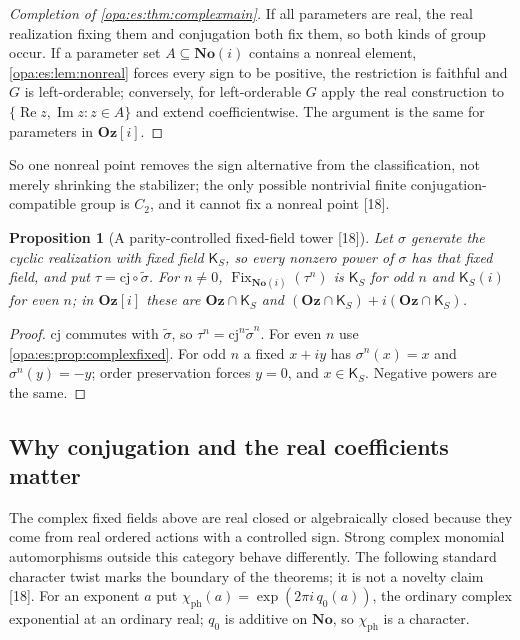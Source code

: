 \documentclass[11pt,oneside]{article}
\numberwithin{equation}{section}
\newtheorem{proposition}[proposition]{Proposition}
\theoremstyle{definition}
\theoremstyle{remark}
\newcommand{\No}{\mathbf{No}}
\newcommand{\Oz}{\mathbf{Oz}}
\newcommand{\Og}{\mathbf{Oz}[i]}
\newcommand{\SC}{\mathbf{No}(i)}
\newcommand{\Fix}{\operatorname{Fix}}
\newcommand{\src}[1]{\textup{\textsf{\small[#1]}}}
\begin{document}
\begin{proof}[Completion of \cref{opa:es:thm:complexmain}]
If all parameters are real, the real realization fixing them and conjugation both fix them, so both kinds of group occur. If a parameter set
$A\subseteq\SC$ contains a nonreal element, \cref{opa:es:lem:nonreal} forces every sign to be positive, the restriction is faithful and $G$ is
left-orderable; conversely, for left-orderable $G$ apply the real construction to $\{\operatorname{Re}z,\operatorname{Im}z:z\in A\}$ and
extend coefficientwise. The argument is the same for parameters in $\Og$.
\end{proof}

So one nonreal point removes the sign alternative from the classification, not merely shrinking the stabilizer; the only possible nontrivial
finite conjugation-compatible group is $C_2$, and it cannot fix a nonreal point \src{18}.

\begin{proposition}[A parity-controlled fixed-field tower \src{18}]\label{opa:es:prop:parity}
Let $\sigma$ generate the cyclic realization with fixed field $\mathsf K_S$, so every nonzero power of $\sigma$ has that fixed field, and put
$\tau=\mathrm{cj}\circ\widetilde\sigma$. For $n\ne0$, $\Fix_{\SC}(\tau^n)$ is $\mathsf K_S$ for odd $n$ and $\mathsf K_S(i)$ for even $n$; in $\Og$ these are
$\Oz\cap\mathsf K_S$ and $(\Oz\cap\mathsf K_S)+i(\Oz\cap\mathsf K_S)$.
\end{proposition}
\begin{proof}
$\mathrm{cj}$ commutes with $\widetilde\sigma$, so $\tau^n=\mathrm{cj}^n\widetilde\sigma^n$. For even $n$ use \cref{opa:es:prop:complexfixed}. For odd $n$ a fixed $x+iy$
has $\sigma^n(x)=x$ and $\sigma^n(y)=-y$; order preservation forces $y=0$, and $x\in\mathsf K_S$. Negative powers are the same.
\end{proof}

\subsection{Why conjugation and the real coefficients matter}

The complex fixed fields above are real closed or algebraically closed because they come from real ordered actions with a controlled sign.
Strong complex monomial automorphisms outside this category behave differently. The following standard character twist marks the boundary
of the theorems; it is not a novelty claim \src{18}. For an exponent $a$ put $\chi_{\mathrm{ph}}(a)=\exp(2\pi i\,q_0(a))$, the ordinary complex
exponential at an ordinary real; $q_0$ is additive on $\No$, so $\chi_{\mathrm{ph}}$ is a character.
\end{document}
